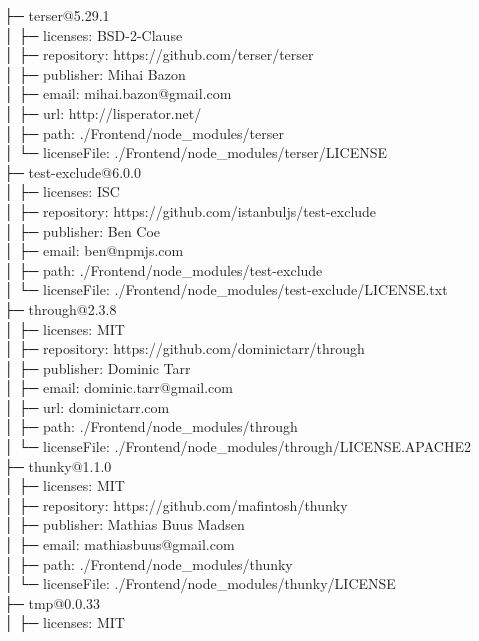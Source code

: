 \documentclass[
    paper=a4,
    twoside=false,
    parskip=half,
    listof=entryprefix,
    listof=totoc,
    index=totoc,
    bibliography=totoc,
    headsepline,
]{scrbook}
\begin{document}
    ├─ terser@5.29.1\\
    │  ├─ licenses: BSD-2-Clause\\
    │  ├─ repository: https://github.com/terser/terser\\
    │  ├─ publisher: Mihai Bazon\\
    │  ├─ email: mihai.bazon@gmail.com\\
    │  ├─ url: http://lisperator.net/\\
    │  ├─ path: ./Frontend/node\_modules/terser\\
    │  └─ licenseFile: ./Frontend/node\_modules/terser/LICENSE\\
    ├─ test-exclude@6.0.0\\
    │  ├─ licenses: ISC\\
    │  ├─ repository: https://github.com/istanbuljs/test-exclude\\
    │  ├─ publisher: Ben Coe\\
    │  ├─ email: ben@npmjs.com\\
    │  ├─ path: ./Frontend/node\_modules/test-exclude\\
    │  └─ licenseFile: ./Frontend/node\_modules/test-exclude/LICENSE.txt\\
    ├─ through@2.3.8\\
    │  ├─ licenses: MIT\\
    │  ├─ repository: https://github.com/dominictarr/through\\
    │  ├─ publisher: Dominic Tarr\\
    │  ├─ email: dominic.tarr@gmail.com\\
    │  ├─ url: dominictarr.com\\
    │  ├─ path: ./Frontend/node\_modules/through\\
    │  └─ licenseFile: ./Frontend/node\_modules/through/LICENSE.APACHE2\\
    ├─ thunky@1.1.0\\
    │  ├─ licenses: MIT\\
    │  ├─ repository: https://github.com/mafintosh/thunky\\
    │  ├─ publisher: Mathias Buus Madsen\\
    │  ├─ email: mathiasbuus@gmail.com\\
    │  ├─ path: ./Frontend/node\_modules/thunky\\
    │  └─ licenseFile: ./Frontend/node\_modules/thunky/LICENSE\\
    ├─ tmp@0.0.33\\
    │  ├─ licenses: MIT\\
\end{document}
